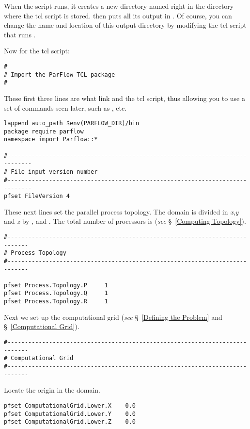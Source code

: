 When the script runs, it creates a new directory named  right in the directory where the tcl script is stored.  \parflow{} then puts all its output in .  Of course, you can change the name and location of this output directory by modifying the tcl script that runs \parflow{}.


Now for the tcl script:

\begin{verbatim}
#
# Import the ParFlow TCL package
#
\end{verbatim}

These first three lines are what link \parflow{} and the tcl script, thus allowing you to use a set of commands seen later, such as , etc.

\begin{verbatim}
lappend auto_path $env(PARFLOW_DIR)/bin 
package require parflow
namespace import Parflow::*

#-----------------------------------------------------------------------------
# File input version number
#-----------------------------------------------------------------------------
pfset FileVersion 4
\end{verbatim}

These next lines set the parallel process topology.  The domain is divided in \emph{x},\emph{y} and \emph{z} by ,  and .
The total number of processors is   (\emph{see} \S~\ref{Computing Topology}).

\begin{verbatim}
#----------------------------------------------------------------------------
# Process Topology
#----------------------------------------------------------------------------

pfset Process.Topology.P     1
pfset Process.Topology.Q     1
pfset Process.Topology.R     1
\end{verbatim}

Next we set up the computational grid (\emph{see} \S~\ref{Defining the Problem} and  \S~\ref{Computational Grid}).

\begin{verbatim}
#----------------------------------------------------------------------------
# Computational Grid
#----------------------------------------------------------------------------
\end{verbatim}

Locate the origin in the domain.

\begin{verbatim}
pfset ComputationalGrid.Lower.X    0.0
pfset ComputationalGrid.Lower.Y    0.0
pfset ComputationalGrid.Lower.Z    0.0
\end{verbatim}

